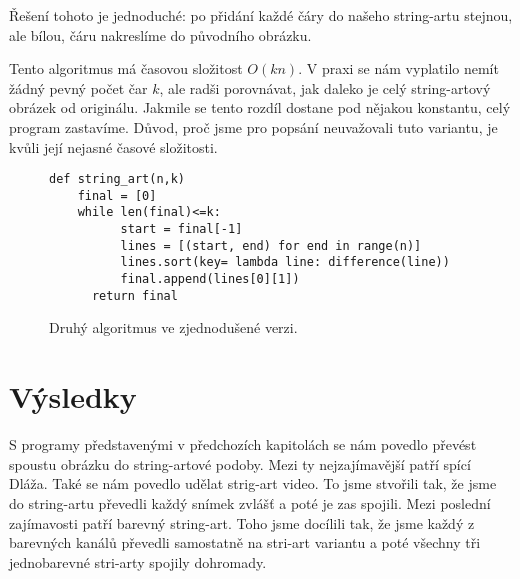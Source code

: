 \documentclass{article}
\begin{document}
Řešení tohoto je jednoduché: po přidání každé čáry do našeho string-artu stejnou,
ale bílou, čáru nakreslíme do původního obrázku.

Tento algoritmus má časovou složitost $O(kn)$. V praxi se nám vyplatilo nemít
žádný pevný počet čar $k$, ale radši porovnávat, jak daleko je celý string-artový obrázek od
originálu. Jakmile se tento rozdíl dostane pod nějakou konstantu, celý
program zastavíme. Důvod, proč jsme pro popsání neuvažovali tuto variantu, je kvůli její
nejasné časové složitosti. 

\begin{figure}
 \label{fig:second}
\begin{mdframed}[style=MyFrame]
\begin{lstlisting}[style=metoo]
def string_art(n,k)
    final = [0]
    while len(final)<=k:
	      start = final[-1]
	      lines = [(start, end) for end in range(n)]
	      lines.sort(key= lambda line: difference(line))
	      final.append(lines[0][1])
	  return final
 \end{lstlisting}
\end{mdframed}

 \caption{Druhý algoritmus ve zjednodušené verzi.}
\end{figure}




\section{Výsledky}
\label{sec:vysledky}
S programy představenými v předchozích kapitolách se nám povedlo převést spoustu
obrázku do string-artové podoby. Mezi ty nejzajímavější patří spící Dláža. Také
se nám povedlo udělat strig-art video. To jsme stvořili tak, že jsme do
string-artu převedli každý snímek zvlášť a poté je zas spojili. Mezi poslední
zajímavosti patří barevný string-art. Toho jsme docílili tak, že jsme každý z
barevných kanálů převedli samostatně na stri-art variantu a poté všechny tři
jednobarevné stri-arty spojily dohromady.

\end{document}
